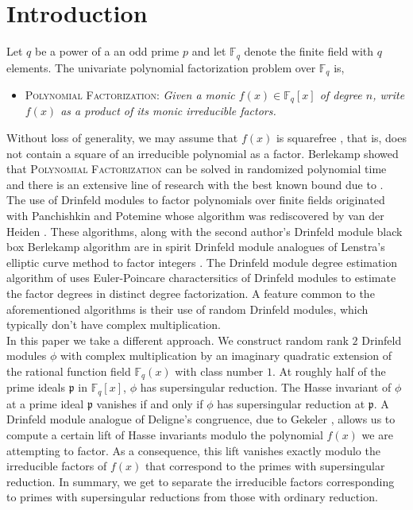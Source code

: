 \documentclass{article}
\theoremstyle{plain}
\theoremstyle{definition}
\def\F{\ensuremath{\mathbb{F}}}
\newcommand{\p}{\mathfrak p}
\begin{document}
\section{Introduction}
Let $q$ be a power of a an odd prime $p$ and let $\F_q$ denote the finite field with $q$ elements. 
The univariate polynomial factorization problem over $\F_q$ is,
\begin{itemize}
 \item \textsc{Polynomial Factorization:} \textit{Given a monic $f(x) \in \mathbb{F}_q[x]$ of 
 degree $n$, write $f(x)$ as a product of its monic irreducible factors.}
\end{itemize}


Without loss of generality, we may assume that $f(x)$ is squarefree \cite{knu,yun}, that is, does 
not contain a square of an irreducible polynomial as a factor. Berlekamp showed that 
\textsc{Polynomial Factorization} can be solved in randomized polynomial time \cite{ber} and there 
is an extensive line of research \cite{cz,gs,ks,ku} with the best known bound due to \cite{ku}. \\

The use of Drinfeld modules to factor polynomials over finite fields originated with Panchishkin 
and Potemine \cite{pp} whose algorithm was rediscovered by van der Heiden \cite{vdH}. These 
algorithms, along with the second author's Drinfeld module black box Berlekamp algorithm \cite{nar} 
are in spirit Drinfeld module analogues of Lenstra's elliptic curve method to factor integers 
\cite{len}. The Drinfeld module degree estimation algorithm of \cite{nar} uses Euler-Poincare 
charactersitics of Drinfeld modules to estimate the factor degrees in distinct degree 
factorization. A feature common to the aforementioned algorithms is their use of random Drinfeld 
modules, which typically don't have complex multiplication. \\


In this paper we take a different approach. We construct random rank $2$ Drinfeld modules $\phi$ 
with complex multiplication by an imaginary quadratic extension of the rational function field 
$\F_q(x)$  with class number $1$. At roughly half of the prime ideals $\p$ in $\F_q[x]$, $\phi$ 
has supersingular reduction. The Hasse invariant of $\phi$ at a prime ideal $\p$ vanishes if and 
only if $\phi$ has supersingular reduction at $\p$. A Drinfeld module analogue of Deligne's 
congruence, due to Gekeler \cite{gek}, allows us to compute a certain lift of Hasse invariants 
modulo the polynomial $f(x)$ we are attempting to factor. As a consequence, this lift vanishes 
exactly modulo the irreducible factors of $f(x)$ that correspond to the primes with supersingular 
reduction. In summary, we get to separate the irreducible factors corresponding to primes with 
supersingular reductions from those with ordinary reduction.
\end{document}
